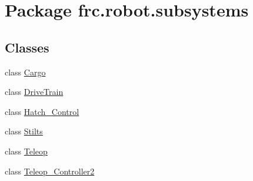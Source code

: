 \hypertarget{namespacefrc_1_1robot_1_1subsystems}{}\section{Package frc.\+robot.\+subsystems}
\label{namespacefrc_1_1robot_1_1subsystems}
\subsection*{Classes}
\begin{DoxyCompactItemize}
\item 
class \hyperlink{classfrc_1_1robot_1_1subsystems_1_1_cargo}{Cargo}
\item 
class \hyperlink{classfrc_1_1robot_1_1subsystems_1_1_drive_train}{Drive\+Train}
\item 
class \hyperlink{classfrc_1_1robot_1_1subsystems_1_1_hatch___control}{Hatch\+\_\+\+Control}
\item 
class \hyperlink{classfrc_1_1robot_1_1subsystems_1_1_stilts}{Stilts}
\item 
class \hyperlink{classfrc_1_1robot_1_1subsystems_1_1_teleop}{Teleop}
\item 
class \hyperlink{classfrc_1_1robot_1_1subsystems_1_1_teleop___controller2}{Teleop\+\_\+\+Controller2}
\end{DoxyCompactItemize}
